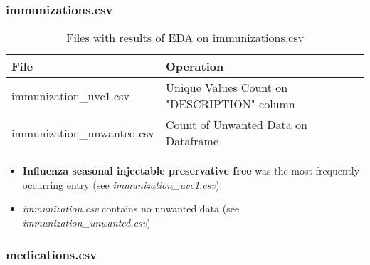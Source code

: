 \documentclass[12pt, twosided]{report}  %
\begin{document}
\subsubsection{immunizations.csv}

\begin{table}[H]
	\centering
	\begin{tabular}{p{5cm}|p{14.5cm}}
		\textbf{File}              & \textbf{Operation} \\ \hline
		immunization\_uvc1.csv     & Unique Values Count on "DESCRIPTION" column\\
		immunization\_unwanted.csv & Count of Unwanted Data on Dataframe
	\end{tabular}
	\caption{Files with results of EDA on immunizations.csv}
\end{table}


\begin{itemize}
	\item \textbf{Influenza  seasonal  injectable  preservative free} was the most frequently occurring entry (see \textit{immunization\_uvc1.csv}).
	
	

	\item \textit{immunization.csv} contains no unwanted data (see \textit{immunization\_unwanted.csv})
	
\end{itemize}

\subsubsection{medications.csv}
\end{document}
